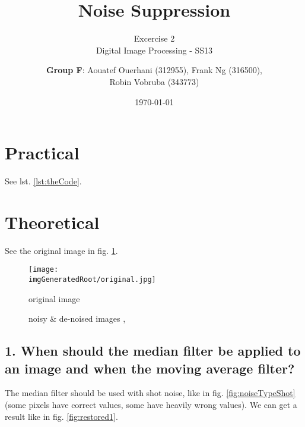 \documentclass[a4paper,headings=small]{scrartcl}
\title{Noise Suppression}
\subtitle{Excercise 2 \\ Digital Image Processing - SS13}
\author{\textbf{Group F}: Aouatef Ouerhani (312955), Frank Ng (316500),\\ Robin Vobruba (343773)}
\date{\today}
\numberwithin{equation}{section} %
\numberwithin{figure}{section}   %
\newcommand{\imgGeneratedRoot}{../../../target}
\begin{document}
\maketitle

\section{Practical}

See lst. \ref{lst:theCode}.


\section{Theoretical}

See the original image in fig. \ref{fig:original}.

\begin{figure}[htbp]
	\centering
	\texttt{[image: \\imgGeneratedRoot/original.jpg]}
	\caption{original image}
	\label{fig:original}
\end{figure}

\begin{figure}[ht]
	\centering



	\caption[Optional caption for list of figures]{
		noisy \& de-noised images , 
	}
	\label{fig:noiseAndRestored}
\end{figure}


\subsection{1. When should the median filter be applied to an image and when the moving average filter?}

The median filter should be used with shot noise,
like in fig. \ref{fig:noiseTypeShot}
(some pixels have correct values, some have heavily wrong values).
We can get a result like in fig. \ref{fig:restored1}.
\end{document}
